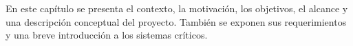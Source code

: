 En este capítulo se presenta el contexto, la motivación, los objetivos, el alcance y una descripción conceptual del proyecto. También se exponen sus requerimientos y una breve introducción a los sistemas críticos. 